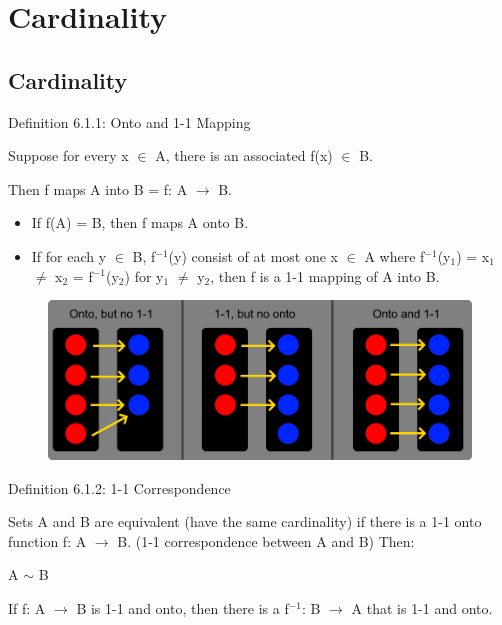 \newpage
\section[Day 6: Cardinality]{Cardinality}

\subsection{ Cardinality }

{ \color{blue} Definition 6.1.1: Onto and 1-1 Mapping } 

	\begin{adjustbox}{minipage=14cm, right, vspace=0.1cm 0cm}
		Suppose for every x $\in$ A, there is an associated f(x) $\in$ B.

		Then f maps A into B = f: A $\rightarrow$ B.

		\begin{itemize}[leftmargin=1cm, itemsep=0.1cm]
			\item If f(A) = B, then f maps A onto B.
			
			\item If for each y $\in$ B, f$^{-1}$(y) consist of at most one x $\in$ A
				where f$^{-1}$(y$_1$) = x$_1$ $\neq$ x$_2$ = f$^{-1}$(y$_2$) for
				y$_1$ $\neq$ y$_2$, then f is a 1-1 mapping of A into B.
		\end{itemize}
	\end{adjustbox}

\begin{figure}[h]
	\centering
	\includegraphics[scale=0.3]{Images/6.1.1.png}
\end{figure}

{ \color{blue} Definition  6.1.2: 1-1 Correspondence} 

	\begin{adjustbox}{minipage=14cm, right, vspace=0.1cm 0cm}
		Sets A and B are equivalent {\color{lblue} (have the same cardinality)}
		if there is a 1-1 onto function f: A $\rightarrow$ B.
		{\color{lblue} (1-1 correspondence between A and B)}
		Then:

		\qquad A $\sim$ B

		If f: A $\rightarrow$ B is 1-1 and onto, then
		there is a f$^{-1}$: B $\rightarrow$ A that is 1-1 and onto. \\
	\end{adjustbox}

